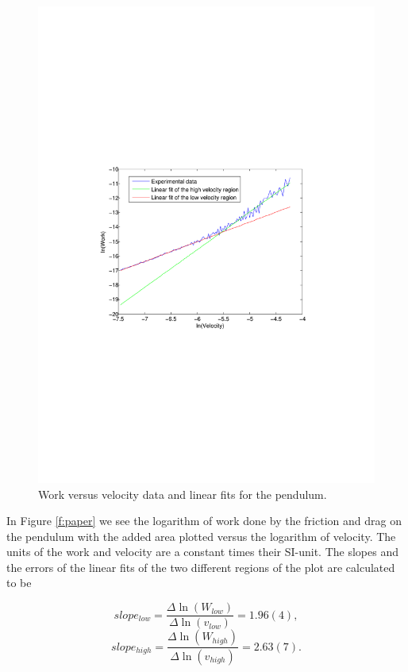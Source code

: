 ﻿\documentclass[11pt, a4paper]{article}
\begin{document}
\begin{figure}[h]
	\centering
	\includegraphics[trim=10.0cm 10.0cm 10.0cm 10.0cm, scale=0.7]{no_paper}
	\caption{Work versus velocity data and  linear fits for the pendulum.}
	\label{f:nopaper}
\end{figure}

In Figure \ref{f:paper} we see the logarithm of work done by the friction and 
drag on the pendulum with the added area plotted versus the logarithm of velocity. 
The units of the work and velocity are a constant times their SI-unit. 
The slopes and the errors of the linear fits of the two different regions of the plot are calculated to be

\[
	slope_{low}=\frac{\Delta\ln(W_{low})}{\Delta\ln(v_{low})} = 1.96(4),
\]\[
	slope_{high}=\frac{\Delta\ln(W_{high})}{\Delta\ln(v_{high})} = 2.63(7).
\]
\end{document}

